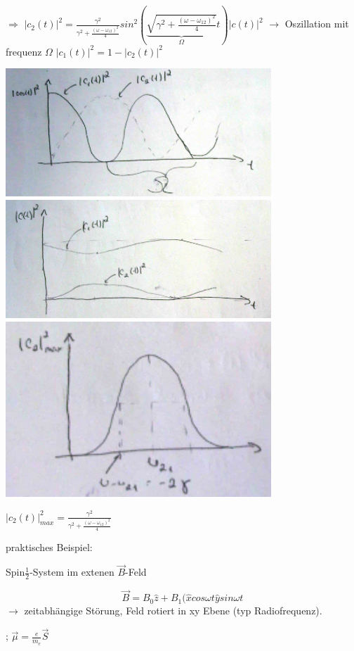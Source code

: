 \(\Rightarrow\) \(|c_2(t)|^2=\frac{\gamma^2}{\gamma^2+\frac{(\omega-\omega_{12})^2}{4}}sin^2\left( \underbrace{\sqrt{\gamma^2+\frac{(\omega-\omega_{12})^2}{4}}}_{\Omega}t\right)|c(t)|^2\) \(\rightarrow\) Oszillation mit frequenz \(\Omega\) \(|c_1(t)|^2 = 1-|c_2(t)|^2\)


\includegraphics[width=0.75\textwidth]{kap03_04.png}
\includegraphics[width=0.75\textwidth]{kap03_05.png}
\includegraphics[width=0.75\textwidth]{kap03_06.png}


\(|c_2(t)|^2_{max}=\frac{\gamma^2}{\gamma^2+\frac{(\omega-\omega_{12})^2}{4}}\)

praktisches Beispiel:

Spin\(\frac{1}{2}\)-System im extenen \(\vec B\)-Feld

\[ \vec B = B_0\hat z + B_1(\hat x cos\omega t \hat y sin\omega t\]
\(\rightarrow\) zeitabhängige Störung, Feld rotiert in xy Ebene (typ Radiofrequenz).

; \(\vec \mu = \frac{e}{m_e}\vec S\)

